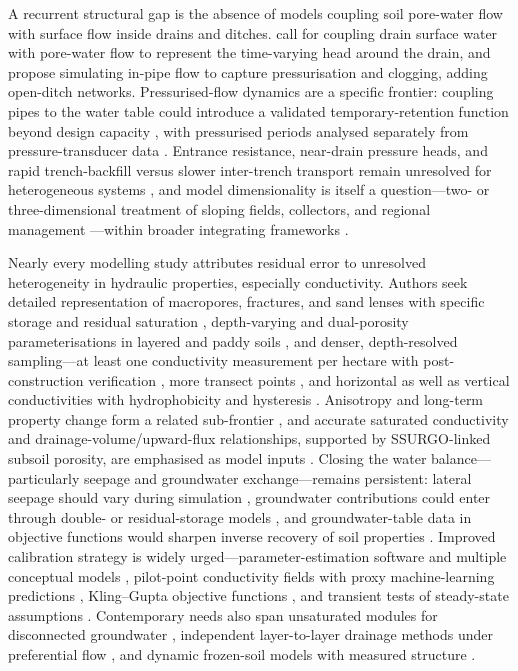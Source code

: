 A recurrent structural gap is the absence of models coupling soil pore-water
flow with surface flow inside drains and ditches. \textcite{Xin2016b} call for
coupling drain surface water with pore-water flow to represent the time-varying
head around the drain, and \textcite{Nousiainen2015} propose simulating in-pipe
flow to capture pressurisation and clogging, adding open-ditch networks.
Pressurised-flow dynamics are a specific frontier: coupling pipes to the water
table could introduce a validated temporary-retention function beyond design
capacity \parencite{Henine2010,Henine2014}, with pressurised periods analysed
separately from pressure-transducer data \parencite{Saadat2018}. Entrance
resistance, near-drain pressure heads, and rapid trench-backfill versus slower
inter-trench transport remain unresolved for heterogeneous systems
\parencite{Messing2006,Rimidis2003}, and model dimensionality is itself a
question---two- or three-dimensional treatment of sloping fields, collectors,
and regional management \parencite{Alakukku2010,FIPPS1989,Carlier2007,Mohanty1998}---within
broader integrating frameworks \parencite{Manguerra1998,SAVABI1993,RevueltaAcosta2021}.

Nearly every modelling study attributes residual error to unresolved
heterogeneity in hydraulic properties, especially conductivity. Authors seek
detailed representation of macropores, fractures, and sand lenses with specific
storage and residual saturation \parencite{DeSchepper2017}, depth-varying and
dual-porosity parameterisations in layered and paddy soils
\parencite{Wesström2003,Karandish2018}, and denser, depth-resolved
sampling---at least one conductivity measurement per hectare with
post-construction verification \parencite{PalaciosVélez2004}, more transect
points \parencite{Messing2006}, and horizontal as well as vertical
conductivities with hydrophobicity and hysteresis \parencite{Tähtikarhu2025}.
Anisotropy and long-term property change form a related sub-frontier
\parencite{Akis2015,Moustafa1998,Koivusalo1999}, and accurate saturated
conductivity and drainage-volume/upward-flux relationships, supported by
SSURGO-linked subsoil porosity, are emphasised as model inputs
\parencite{DeBoer2006,Schilling2015,DeSchepper2015}. Closing the water
balance---particularly seepage and groundwater exchange---remains persistent:
lateral seepage should vary during simulation \parencite{Feng2018}, groundwater
contributions could enter through double- or residual-storage models
\parencite{DaneshYazdi2016}, and groundwater-table data in objective functions
would sharpen inverse recovery of soil properties
\parencite{Sedaghatdoost2018,Sedaghatdoost2019}. Improved calibration strategy is
widely urged---parameter-estimation software and multiple conceptual models
\parencite{Boico2022}, pilot-point conductivity fields with proxy
machine-learning predictions \parencite{Schneider2022}, Kling--Gupta objective
functions \parencite{Brighenti2023}, and transient tests of steady-state
assumptions \parencite{Schilling2022,Gates2002,Burkhalter2006}. Contemporary
needs also span unsaturated modules for disconnected groundwater
\parencite{Kompanizare2024}, independent layer-to-layer drainage methods under
preferential flow \parencite{Ojeda2018}, and dynamic frozen-soil models with
measured structure \parencite{Ulén2016}.

